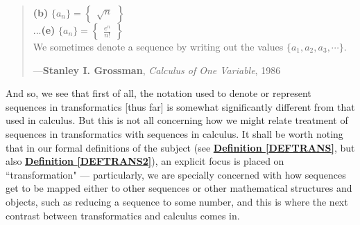 \documentclass[a4paper, 18pt]{book} %
\begin{document}
\begin{appendices}
\begin{minipage}{1\textwidth}
\begin{quotation}
{\textbf{(b)} $\{a_n\} = \begin{Bmatrix}\sqrt{n}\end{Bmatrix}$\\ 

...\textbf{(e)} $\{a_n\} = \begin{Bmatrix}\frac{e^n}{n!}\end{Bmatrix}$\\ 

We sometimes denote a sequence by writing out the values $\{ a_1, a_2, a_3, \cdots \}$. 

}
\hspace*{\fill} ---\textbf{Stanley I. Grossman}, \textit{Calculus of One Variable}, 1986\cite{Grossman1986CalculusOneVariable}
\end{quotation}
\vspace{1em}
\end{minipage}

\vspace{2em}


And so, we see that first of all, the notation used to denote or represent sequences in transformatics [thus far] is somewhat significantly different from that used in calculus. But this is not all concerning how we might relate treatment of sequences in transformatics with sequences in calculus. It shall be worth noting that in our formal definitions of the subject (see \textbf{\hyperref[DEFTRANS]{Definition \ref{DEFTRANS}}}, but also \textbf{\hyperref[DEFTRANS2]{Definition \ref{DEFTRANS2}}}), an explicit focus is placed on ``transformation" --- particularly, we are specially concerned with how sequences get to be mapped either to other sequences or other mathematical structures and objects, such as reducing a sequence to some number, and this is where the next contrast between transformatics and calculus comes in.

\vspace{2em}



\end{appendices}
\end{document}
